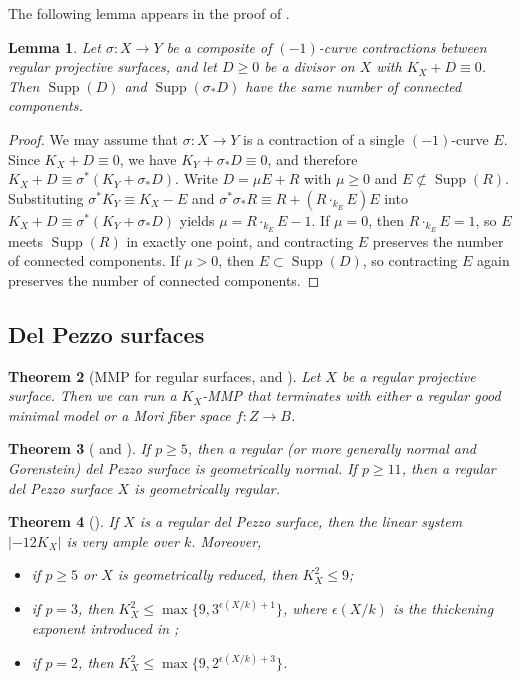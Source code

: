 \documentclass[reqno,oneside]{amsart}
\newtheorem{theorem}{Theorem}[section]
\newtheorem{lemma}[theorem]{Lemma}
\theoremstyle{definition}
\theoremstyle{plain}
\numberwithin{equation}{section}
\newcommand\Supp{\operatorname{Supp}}
\begin{document}
The following lemma appears in the proof of \cite[Theorem~1]{Umezu-1981}.
\begin{lemma}\label{lemma-crepant-connected}
  Let $\sigma\colon X\to Y$ be a composite of $(-1)$-curve contractions between regular projective surfaces, and let $D\ge0$ be a divisor on $X$ with $K_{X} + D\equiv 0$.
  Then $\Supp(D)$ and $\Supp(\sigma_*D)$ have the same number of connected components.
\end{lemma}
\begin{proof}
  We may assume that $\sigma\colon X\to Y$ is a contraction of a single $(-1)$-curve $E$.
  Since $K_X + D \equiv 0$, we have $K_Y + \sigma_*D \equiv 0$, and therefore $K_X + D\equiv \sigma^*(K_Y + \sigma_*D)$.
  Write $D = \mu E + R$ with $\mu\ge0$ and $E\not\subset\Supp(R)$.
  Substituting $\sigma^*K_Y \equiv K_X - E$ and $\sigma^*\sigma_*R \equiv R + (R\cdot_{k_E} E)E$ into $K_X + D\equiv \sigma^*(K_Y + \sigma_*D)$ yields $\mu = R\cdot_{k_E} E - 1$.
  If $\mu=0$, then $R\cdot_{k_E} E=1$, so $E$ meets $\Supp(R)$ in exactly one point, and contracting $E$ preserves the number of connected components.
  If $\mu>0$, then $E\subset\Supp(D)$, so contracting $E$ again preserves the number of connected components.
\end{proof}


\subsection{Del Pezzo surfaces}\label{subsection-del-pezzo}
\begin{theorem}[MMP for regular surfaces, {\cite[p.~5]{Tanaka-2018-MMP-excelent-surface}} and {\cite[Theorem~1.2]{tanaka_abundance_2020}}]\label{theorem-mmp-surf}
  Let $X$ be a regular projective surface.
  Then we can run a $K_X$-MMP that terminates with either a regular good minimal model or a Mori fiber space $f\colon Z\to B$.
\end{theorem}


\begin{theorem}[{\cite[Theorem~1.5]{Patakfalvi-Waldron-2022} and \cite[Proposition~5.2]{Bernasconi-Tanaka-22}}]\label{theorem-PW22-1.5}
  If $p\ge5$, then a regular (or more generally normal and Gorenstein) del Pezzo surface is geometrically normal.
  If $p\ge11$, then a regular del Pezzo surface $X$ is geometrically regular.
\end{theorem}

\begin{theorem}[{\cite[Theorems~1.1 and 1.8]{Tanaka-24-Bound}}]\label{theorem-bd-del-pezzo}
  If $X$ is a regular del Pezzo surface, then the linear system $\lvert -12 K_X \rvert$ is very ample over $k$.
  Moreover,
  \begin{itemize}
    \item if $p\ge5$ or $X$ is geometrically reduced, then $K_X^2 \le 9$;
    \item if $p = 3$, then $K_X ^2 \le \max \{ 9, 3^{\epsilon(X/k) + 1}\}$, where $\epsilon(X/k)$ is the thickening exponent introduced in \cite{tanaka_invariants_2021};
    \item if $p = 2$, then $K_X ^2 \le \max \{ 9, 2^{\epsilon(X/k) + 3}\}$.
  \end{itemize}
\end{theorem}
\end{document}
